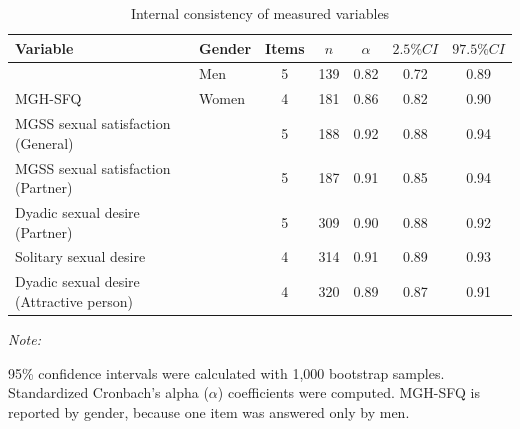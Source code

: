 \documentclass[
  bookmarksnumbered]{article}
\newenvironment{Shaded}{\begin{snugshade}}{\end{snugshade}}
\newcommand{\AttributeTok}[1]{\textcolor[rgb]{0.80,0.80,0.80}{#1}}
\newcommand{\ConstantTok}[1]{\textcolor[rgb]{0.86,0.64,0.64}{\textbf{#1}}}
\newcommand{\FunctionTok}[1]{\textcolor[rgb]{0.94,0.94,0.56}{#1}}
\newcommand{\NormalTok}[1]{\textcolor[rgb]{0.80,0.80,0.80}{#1}}
\newcommand{\SpecialCharTok}[1]{\textcolor[rgb]{0.86,0.64,0.64}{#1}}
\newcommand{\StringTok}[1]{\textcolor[rgb]{0.80,0.58,0.58}{#1}}
\begin{document}
\begin{Shaded}
\end{Shaded}

\begin{table}[H]

\caption{\label{tab:Cronbach-tab}Internal consistency of measured variables}
\centering
\begin{threeparttable}
\begin{tabular}[t]{llccccc}
\toprule
Variable & Gender & Items & $n$ & $\alpha$ & $2.5\% CI$ & $97.5\% CI$\\
\midrule
 & Men & 5 & 139 & 0.82 & 0.72 & 0.89\\
\cmidrule{2-7}
\multirow{-2}{*}{\raggedright\arraybackslash MGH-SFQ} & Women & 4 & 181 & 0.86 & 0.82 & 0.90\\
\cmidrule{1-7}
MGSS sexual satisfaction (General) &  & 5 & 188 & 0.92 & 0.88 & 0.94\\
\cmidrule{1-7}
MGSS sexual satisfaction (Partner) &  & 5 & 187 & 0.91 & 0.85 & 0.94\\
\cmidrule{1-7}
Dyadic sexual desire (Partner) &  & 5 & 309 & 0.90 & 0.88 & 0.92\\
\cmidrule{1-7}
Solitary sexual desire &  & 4 & 314 & 0.91 & 0.89 & 0.93\\
\cmidrule{1-7}
Dyadic sexual desire (Attractive person) &  & 4 & 320 & 0.89 & 0.87 & 0.91\\
\bottomrule
\end{tabular}
\begin{tablenotes}[para]
\item \textit{Note: } 
\item 95\% confidence intervals were calculated with 1,000 bootstrap samples.
           Standardized Cronbach's alpha ($\alpha$) coefficients were computed. 
           MGH-SFQ is reported by gender, because one item was answered only by men.
\end{tablenotes}
\end{threeparttable}
\end{table}
\end{document}
